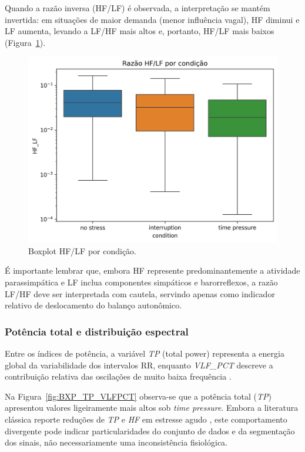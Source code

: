 \documentclass[conference]{IEEEtran}
\begin{document}
Quando a razão inversa (HF/LF) é observada, a interpretação se mantém invertida: em situações de maior demanda (menor influência vagal), HF diminui e LF aumenta, levando a LF/HF mais altos e, portanto, HF/LF mais baixos (Figura~\ref{fig:hflf_box}).

\begin{figure}[H]
    \centering
    \includegraphics[width=0.8\linewidth]{../../../images/Anderson/box_hf_lf_condition_logscale.png}
    \caption{Boxplot HF/LF por condição.}
    \label{fig:hflf_box}
\end{figure}

É importante lembrar que, embora HF represente predominantemente a atividade parassimpática e LF inclua componentes simpáticos e barorreflexos, a razão LF/HF deve ser interpretada com cautela, servindo apenas como indicador relativo de deslocamento do balanço autonômico.

\subsubsection{Potência total e distribuição espectral}

Entre os índices de potência, a variável \textit{TP} (total power) representa a energia global da variabilidade dos intervalos RR, enquanto \textit{VLF\_PCT} descreve a contribuição relativa das oscilações de muito baixa frequência \cite{R3}. 

Na Figura~\ref{fig:BXP_TP_VLFPCT} observa-se que a potência total (\textit{TP}) apresentou valores ligeiramente mais altos sob \textit{time pressure}. 
Embora a literatura clássica reporte reduções de \textit{TP} e \textit{HF} em estresse agudo \cite{R1}, este comportamento divergente pode indicar particularidades do conjunto de dados e da segmentação dos sinais, não necessariamente uma inconsistência fisiológica. 
\end{document}

